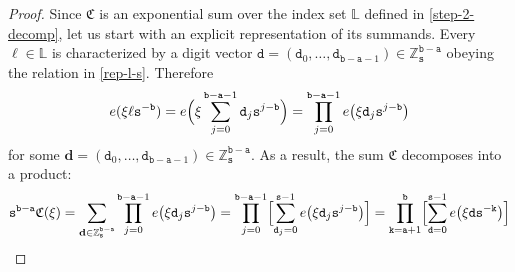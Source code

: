 \documentclass[12pt, twoside]{article}
\theoremstyle{definition}
\numberwithin{equation}{section}
\begin{document}
\begin{proof} 
Since $\mathfrak C$ is an exponential sum over the index set $\mathbb L$ defined in \eqref{step-2-decomp}, let us start with an explicit representation of its summands. Every $\ell \in \mathbb L$ is characterized by a digit vector $\mathtt d = (\mathtt d_0, \ldots, \mathtt d_{\mathtt b-\mathtt a-1}) \in \mathbb Z_{\mathtt s}^{\mathtt b - \mathtt a}$ obeying the relation in \eqref{rep-l-s}. Therefore 
\begin{align*}
e(\xi \ell \mathtt s^{-\mathtt b}) = e \Bigl( \xi \sum_{j=0}^{\mathtt b - \mathtt a-1} \mathtt d_j \mathtt s^{j - \mathtt b}\Bigr) = \prod_{j=0}^{\mathtt b-\mathtt a-1} e \bigl(\xi \mathtt d_j \mathtt s^{j - \mathtt b} \bigr) 
\end{align*} 
for some $\mathbf d = (\mathtt d_0, \ldots, \mathtt d_{\mathtt b-\mathtt a-1}) \in \mathbb Z_{\mathtt s}^{\mathtt b-\mathtt a}$.  As a result, the sum  $\mathfrak C$  decomposes into a product: 
\begin{align} 
\mathtt s^{\mathtt b-\mathtt a} \mathfrak C(\xi) &= \sum_{\mathbf d \in \mathbb Z_{\mathtt s}^{\mathtt b-\mathtt a}} \prod_{j=0}^{\mathtt b-\mathtt a-1} e \bigl(\xi \mathtt d_j \mathtt s^{j - \mathtt b} \bigr) = \prod_{j=0}^{\mathtt b - \mathtt a-1} \Bigl[ \sum_{\mathtt d_j =0}^{\mathtt s-1} e\bigl( \xi \mathtt d_j \mathtt s^{j-\mathtt b} \bigr) \Bigr] =  \prod_{\mathtt k=\mathtt a+1}^{\mathtt b} \Bigl[ \sum_{\mathtt d =0}^{\mathtt s-1}  e\bigl( \xi \mathtt d \mathtt s^{-\mathtt k} \bigr) \Bigr]  \nonumber \\

\end{align}
\end{proof}
\end{document}
